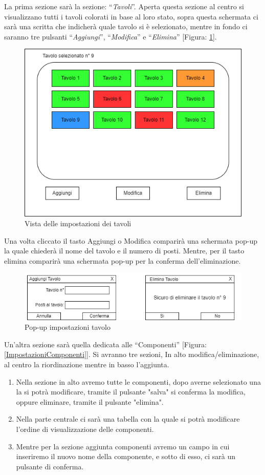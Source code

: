 \documentclass[12pt, letterpaper]{book}
\begin{document}
La prima sezione sarà la sezione: “\textit{Tavoli}”. Aperta questa sezione al centro si visualizzano tutti i tavoli colorati in base al loro stato, sopra questa schermata ci sarà una scritta che indicherà quale tavolo si è selezionato, mentre in fondo ci saranno tre pulsanti “\textit{Aggiungi}”, “\textit{Modifica}” e “\textit{Elimina}” [Figura: \ref{ImpostazioniTavolo}].
\begin{figure}[H]
    \centering
    \includegraphics[width = 0.5 \linewidth]{../Documentazione/Drawio/ImpostazioniTavolo.png}
    \caption{Vista delle impostazioni dei tavoli}
    \label{ImpostazioniTavolo}
\end{figure}

Una volta cliccato il tasto Aggiungi o Modifica comparirà una schermata pop-up la quale chiederà il nome del tavolo e il numero di posti. Mentre, per il tasto elimina comparirà una schermata pop-up per la conferma dell'eliminazione.

\begin{figure}[h]
    \centering
    \includegraphics[width = 0.8 \linewidth]{../Documentazione/Drawio/AggiungiEliminaTavolo.png}
    \caption{Pop-up impostazioni tavolo}
    \label{AggiungiEliminaTavolo}
\end{figure}

Un'altra sezione sarà quella dedicata alle “Componenti” [Figura: \ref{ImpostazioniComponenti}]. Si avranno tre sezioni, In alto modifica/eliminazione, al centro la riordinazione mentre in basso l'aggiunta.
\begin{enumerate}
    \item Nella sezione in alto avremo tutte le componenti, dopo averne selezionato una la si potrà modificare, tramite il pulsante "salva" si conferma la modifica, oppure eliminare, tramite il pulsante "elimina".
    \item Nella parte centrale ci sarà una tabella con la quale si potrà modificare l'ordine di visualizzazione delle componenti.
    \item Mentre per la sezione aggiunta componenti avremo un campo in cui inseriremo il nuovo nome della componente, e sotto di esso, ci sarà un pulsante di conferma.

\end{enumerate}
\end{document}
